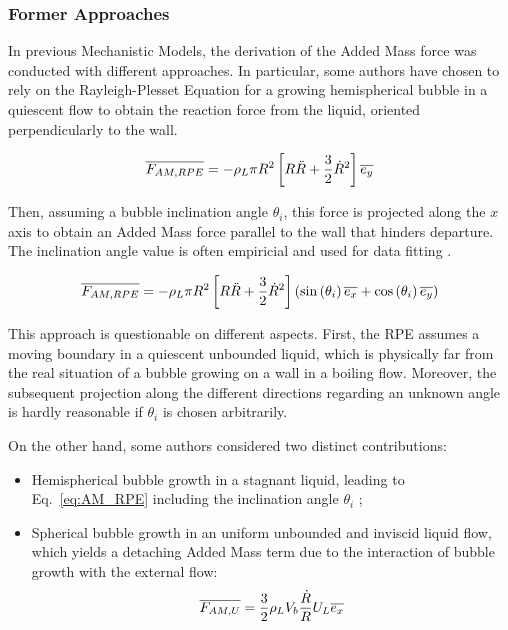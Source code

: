 \subsubsection{Former Approaches}
\label{subsubsec:former_AM}

In previous Mechanistic Models, the derivation of the Added Mass force was conducted with different approaches. In particular, some authors have chosen to rely on the Rayleigh-Plesset Equation for a growing hemispherical bubble in a quiescent flow to obtain the reaction force from the liquid, oriented perpendicularly to the wall.

\begin{equation}
\overline{F_{AM,RPE}}=- \rho_{L}\pi R^{2}\left[ R\ddot{R}+\frac{3}{2}\dot{R}^{2} \right]\overline{e_{y}}
\end{equation}

Then, assuming a bubble inclination angle $\theta_{i}$, this force is projected along the $x$ axis to obtain an Added Mass force parallel to the wall that hinders departure. The inclination angle value is often empiricial and used for data fitting \cite{zeng_unified_1993-1, colombo_prediction_2015, mazzocco_reassessed_2018, ren_development_2020}.

\begin{equation}
\overline{F_{AM,RPE}}=- \rho_{L}\pi R^{2}\left[ R\ddot{R}+\frac{3}{2}\dot{R}^{2} \right]\left( \mathrm{sin}\left( \theta_{i} \right)\overline{e_{x}} + \mathrm{cos}\left( \theta_{i} \right)\overline{e_{y}} \right)
\label{eq:AM_RPE}
\end{equation}


This approach is questionable on different aspects. First, the RPE assumes a moving boundary in a quiescent unbounded liquid, which is physically far from the real situation of a bubble growing on a wall in a boiling flow. Moreover, the subsequent projection along the different directions regarding an unknown angle is hardly reasonable if $\theta_{i}$ is chosen arbitrarily.



On the other hand, some authors \cite{klausner_vapor_1993, thorncroft_bubble_2001, guan_bubble_2015} considered two distinct contributions: 

\begin{itemize}

\item Hemispherical bubble growth in a stagnant liquid, leading to Eq.~\ref{eq:AM_RPE} including the inclination angle $\theta_{i}$ ;
\item Spherical bubble growth in an uniform unbounded and inviscid liquid flow, which yields a detaching Added Mass term  due to the interaction of bubble growth with the external flow: 
\begin{equation}
\overline{F_{AM,U}}= \frac{3}{2}\rho_{L}V_{b}\frac{\dot{R}}{R}U_{L} \overline{e_{x}} 
\label{eq:AM_bulk}
\end{equation} 

\end{itemize}

